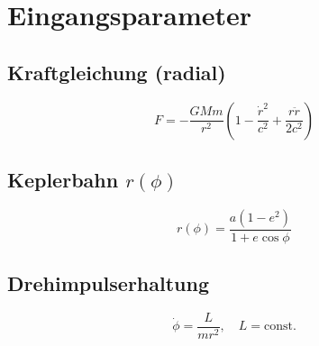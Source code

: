 \section{Eingangsparameter}
\subsection{Kraftgleichung (radial)}
\[
F = -\frac{GMm}{r^2} \left( 1 - \frac{\dot{r}^2}{c^2} + \frac{r \ddot{r}}{2c^2} \right)
\]

\subsection{Keplerbahn \( r(\phi) \)}
\[
r(\phi) = \frac{a(1 - e^2)}{1 + e \cos \phi}
\]

\subsection{Drehimpulserhaltung}
\[
\dot{\phi} = \frac{L}{m r^2}, \quad L = \text{const.}
\]